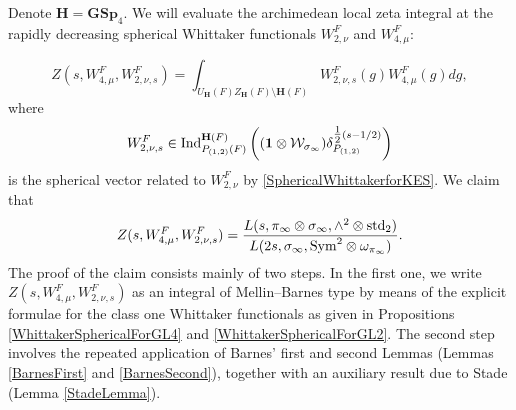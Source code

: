 \documentclass[11pt, reqno]{amsart}
\theoremstyle{plain}
\theoremstyle{definition}
\theoremstyle{remark}
\theoremstyle{plain}
\def\H{{H}}
\def\H{\mathbf{H}}
\def\GSp{{\mathbf{GSp}}}
\begin{document}
Denote $\H = \GSp_4$. We will evaluate the archimedean local zeta integral at the rapidly decreasing spherical Whittaker functionals $W_{2,\nu}^F$ and $W_{4,\mu}^F$:

\[Z(s, W_{4,\mu}^F, W_{2,\nu,s}^F) =\int_{U_\H(F)Z_\H(F)\setminus \H(F)} W_{2,\nu,s}^F(g)W_{4,\mu}^F(g)dg,\]
where \[W_{2,\nu,s}^F \in {\rm Ind}_{P_{(1,2)}(F)}^{\H(F)}\left((\mathbf{1} \otimes\mathcal{W}_{\sigma_\infty}) \delta_{P_{(1,2)}}^{\tfrac{1}{2}(s-1/2)}\right)\]
is the spherical vector related to $W_{2,\nu}^F$ by \eqref{SphericalWhittakerforKES}. We claim that \[Z(s, W_{4,\mu}^F, W_{2,\nu,s}^F) = \frac{L(s, \pi_\infty \otimes \sigma_\infty, \wedge^2 \otimes  \mathrm{std}_2)}{L(2s, \sigma_\infty, {\rm Sym}^2 \otimes \omega_{\pi_\infty})}. \]
The proof of the claim consists mainly of two steps. In the first one, we write $Z(s, W_{4,\mu}^F, W_{2,\nu,s}^F)$ as an integral of Mellin--Barnes type by means of the explicit formulae for the class one Whittaker functionals  as given in Propositions \ref{WhittakerSphericalForGL4} and \ref{WhittakerSphericalForGL2}. The second step involves the repeated application of Barnes' first and second Lemmas (Lemmas \ref{BarnesFirst} and \ref{BarnesSecond}), together with an auxiliary result due to Stade (Lemma \ref{StadeLemma}). 
\end{document}
